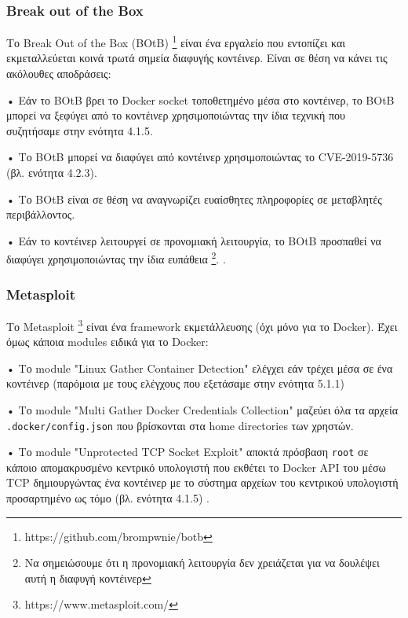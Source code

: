 \subsubsection{\textlatin{Break out of the Box}}

Το \textlatin{Break Out of the Box (BOtB)}
\footnote{\textlatin{https://github.com/brompwnie/botb}} είναι ένα εργαλείο που
εντοπίζει και εκμεταλλεύεται κοινά τρωτά σημεία διαφυγής κοντέινερ. Είναι σε
θέση να κάνει τις ακόλουθες αποδράσεις:

• Εάν το \textlatin{BOtB} βρει το \textlatin{Docker socket} τοποθετημένο μέσα
στο κοντέινερ, το \textlatin{BOtB} μπορεί να ξεφύγει από το κοντέινερ
χρησιμοποιώντας την ίδια τεχνική που συζητήσαμε στην ενότητα 4.1.5.

• Το \textlatin{BOtB} μπορεί να διαφύγει από κοντέινερ χρησιμοποιώντας το
\textlatin{CVE-2019-5736} (βλ. ενότητα 4.2.3).

• Το \textlatin{BOtB} είναι σε θέση να αναγνωρίζει ευαίσθητες πληροφορίες σε
μεταβλητές περιβάλλοντος.

• Εάν το κοντέινερ λειτουργεί σε προνομιακή λειτουργία, το BOtB προσπαθεί να
διαφύγει χρησιμοποιώντας την ίδια ευπάθεια \footnote{Να σημειώσουμε ότι η
προνομιακή λειτουργία δεν χρειάζεται για να δουλέψει αυτή η διαφυγή κοντέινερ}.
\cite{TrailOfBits-Docker-Escape}.

\subsubsection{\textlatin{Metasploit}}

Το \textlatin{Metasploit} \footnote{\textlatin{https://www.metasploit.com/}}
είναι ένα \textlatin{framework} εκμετάλλευσης (όχι μόνο για το
\textlatin{Docker}). Έχει όμως κάποια \textlatin{modules} ειδικά για το
 \textlatin{Docker}:

• Το \textlatin{module} "\textlatin{Linux Gather Container Detection}" ελέγχει
εάν τρέχει μέσα σε ένα κοντέινερ (παρόμοια με τους ελέγχους που εξετάσαμε στην
ενότητα 5.1.1) \cite{Metasploit-Linux-Gather-Container-Detection}

• Το \textlatin{module} "\textlatin{Multi Gather Docker Credentials Collection}"
μαζεύει όλα τα αρχεία \texttt{\textlatin{.docker/config.json}} που βρίσκονται
στα \textlatin{home directories} των χρηστών.
\cite{More-Secure-Non-Root-Container}

• Το \textlatin{module} "\textlatin{Unprotected TCP Socket Exploit}" αποκτά
πρόσβαση \texttt{\textlatin{root}} σε κάποιο απομακρυσμένο κεντρικό υπολογιστή
που εκθέτει το \textlatin{Docker API} του μέσω \textlatin{TCP} δημιουργώντας ένα
κοντέινερ με το σύστημα αρχείων του κεντρικού υπολογιστή προσαρτημένο ως τόμο
(βλ. ενότητα 4.1.5) \cite{Metasploit-Unprotected-TCP-Socket}.

